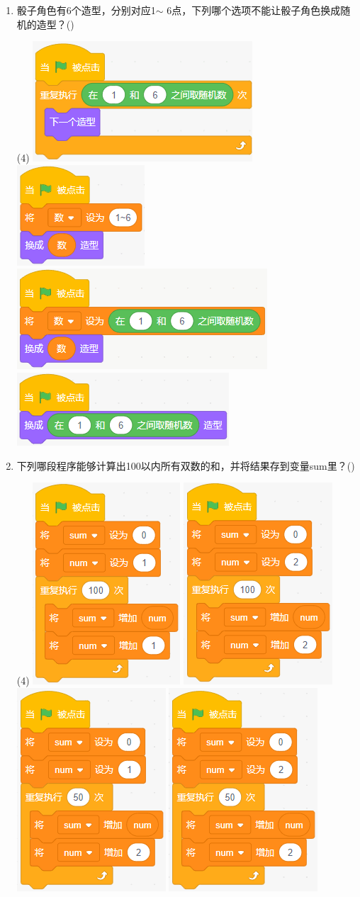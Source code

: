 \documentclass[10pt, a4paper]{article}
\newcommand{\hq}{\hfill(\qquad)}
\begin{document}
\begin{enumerate}
        \item 骰子角色有6个造型，分别对应1$\sim$ 6点，下列哪个选项不能让骰子角色换成随机的造型？\hq
        \begin{tasks}(4)
            \task \includegraphics[width=.17\textwidth]{figure/17a.png}
            \task \includegraphics[width=.12\textwidth]{figure/17b.png}
            \task \includegraphics[width=.18\textwidth]{figure/17c.png}
            \task \includegraphics[width=.18\textwidth]{figure/17d.png}
        \end{tasks}

        \item 下列哪段程序能够计算出100以内所有双数的和，并将结果存到变量sum里？\hq
        \begin{tasks}(4)
            \task \includegraphics[width=.12\textwidth]{figure/18a.png}
            \task \includegraphics[width=.12\textwidth]{figure/18b.png}
            \task \includegraphics[width=.12\textwidth]{figure/18c.png}
            \task \includegraphics[width=.12\textwidth]{figure/18d.png}
        \end{tasks}


\end{enumerate}
\end{document}
